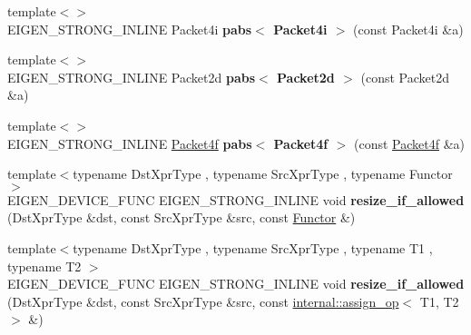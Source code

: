 \begin{DoxyCompactItemize}
\item 
\mbox{\label{namespace_eigen_1_1internal_a163de947bfa2499ca30d044121d9bb0b}} 
{\footnotesize template$<$$>$ }\\E\+I\+G\+E\+N\+\_\+\+S\+T\+R\+O\+N\+G\+\_\+\+I\+N\+L\+I\+NE Packet4i {\bfseries pabs$<$ Packet4i $>$} (const Packet4i \&a)
\item 
\mbox{\label{namespace_eigen_1_1internal_ab42ad42cb12bb736597e52f81b1ccaf7}} 
{\footnotesize template$<$$>$ }\\E\+I\+G\+E\+N\+\_\+\+S\+T\+R\+O\+N\+G\+\_\+\+I\+N\+L\+I\+NE Packet2d {\bfseries pabs$<$ Packet2d $>$} (const Packet2d \&a)
\item 
\mbox{\label{namespace_eigen_1_1internal_a2636173af6863de34e156dfbf6ed6301}} 
{\footnotesize template$<$$>$ }\\E\+I\+G\+E\+N\+\_\+\+S\+T\+R\+O\+N\+G\+\_\+\+I\+N\+L\+I\+NE \hyperlink{struct_eigen_1_1internal_1_1_packet4f}{Packet4f} {\bfseries pabs$<$ Packet4f $>$} (const \hyperlink{struct_eigen_1_1internal_1_1_packet4f}{Packet4f} \&a)
\item 
\mbox{\label{namespace_eigen_1_1internal_a21ebfb5e1f166f266aa5ae63dd47f1ed}} 
{\footnotesize template$<$typename Dst\+Xpr\+Type , typename Src\+Xpr\+Type , typename Functor $>$ }\\E\+I\+G\+E\+N\+\_\+\+D\+E\+V\+I\+C\+E\+\_\+\+F\+U\+NC E\+I\+G\+E\+N\+\_\+\+S\+T\+R\+O\+N\+G\+\_\+\+I\+N\+L\+I\+NE void {\bfseries resize\+\_\+if\+\_\+allowed} (Dst\+Xpr\+Type \&dst, const Src\+Xpr\+Type \&src, const \hyperlink{struct_functor}{Functor} \&)
\item 
\mbox{\label{namespace_eigen_1_1internal_af52d9f6e29ebfaacb3d697d247527026}} 
{\footnotesize template$<$typename Dst\+Xpr\+Type , typename Src\+Xpr\+Type , typename T1 , typename T2 $>$ }\\E\+I\+G\+E\+N\+\_\+\+D\+E\+V\+I\+C\+E\+\_\+\+F\+U\+NC E\+I\+G\+E\+N\+\_\+\+S\+T\+R\+O\+N\+G\+\_\+\+I\+N\+L\+I\+NE void {\bfseries resize\+\_\+if\+\_\+allowed} (Dst\+Xpr\+Type \&dst, const Src\+Xpr\+Type \&src, const \hyperlink{struct_eigen_1_1internal_1_1assign__op}{internal\+::assign\+\_\+op}$<$ T1, T2 $>$ \&)
\item 
\mbox{\label{namespace_eigen_1_1internal_acad2d3161008ad15e0d086b71783de25}} 

\end{DoxyCompactItemize}

